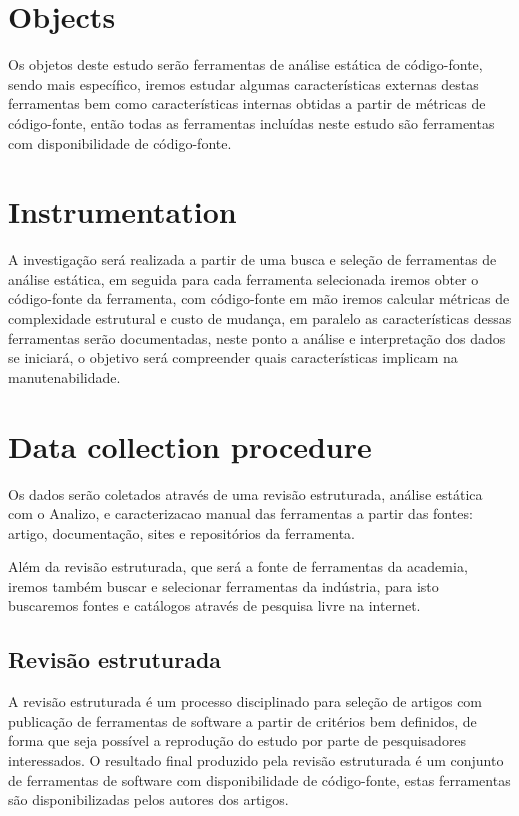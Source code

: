 \section{Objects}

Os objetos deste estudo serão ferramentas de análise estática de código-fonte,
sendo mais específico, iremos estudar algumas características externas destas
ferramentas bem como características internas obtidas a partir de métricas de
código-fonte, então todas as ferramentas incluídas neste estudo são ferramentas
com disponibilidade de código-fonte.

\section{Instrumentation}

A investigação será realizada a partir de uma busca e seleção de ferramentas de
análise estática, em seguida para cada ferramenta selecionada iremos obter
o código-fonte da ferramenta, com código-fonte em mão iremos calcular métricas
de complexidade estrutural e custo de mudança, em paralelo as características
dessas ferramentas serão documentadas, neste ponto a análise e interpretação
dos dados se iniciará, o objetivo será compreender quais características
implicam na manutenabilidade.

\section{Data collection procedure}

Os dados serão coletados através de uma revisão estruturada, análise estática
com o Analizo, e caracterizacao manual das ferramentas a partir das fontes:
artigo, documentação, sites e repositórios da ferramenta.

Além da revisão estruturada, que será a fonte de ferramentas da academia,
iremos também buscar e selecionar ferramentas da indústria, para isto
buscaremos fontes e catálogos através de pesquisa livre na internet.

\subsection{Revisão estruturada}

A revisão estruturada é um processo disciplinado para seleção de artigos com
publicação de ferramentas de software a partir de critérios bem definidos, de
forma que seja possível a reprodução do estudo por parte de pesquisadores
interessados. O resultado final produzido pela revisão estruturada é um conjunto
de ferramentas de software com disponibilidade de código-fonte, estas ferramentas
são disponibilizadas pelos autores dos artigos.

